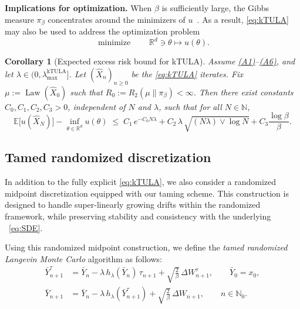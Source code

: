 \documentclass[11pt,a4paper,reqno]{amsart}
\theoremstyle{plain}
\newtheorem{corollary}{Corollary}
\theoremstyle{definition}
\theoremstyle{remark}
\newcommand{\R}{\mathbb{R}}
\newcommand{\E}{\mathbb{E}}
\DeclareMathOperator{\Law}{Law}
\begin{document}
\medskip
\noindent\textbf{Implications for optimization.}
When $\beta$ is sufficiently large, the Gibbs measure $\pi_\beta$ concentrates around the minimizers of $u$~\cite{hwang1980laplace}. As a result, \eqref{eq:kTULA} may also be used to address the optimization problem
\[
\operatorname*{minimize} \qquad \mathbb{R}^d \ni \theta \mapsto u(\theta).
\]

\begin{corollary}[Expected excess risk bound for kTULA]
\label{cor:excess-risk-ktula}
Assume \hyperref[ass:PJG]{\textup{(A1)}}--\hyperref[ass:LSI]{\textup{(A6)}}, and let $\lambda\in(0,\lambda_{\max}^{\mathrm{kTULA}}]$. Let $(\widehat X_n)_{n\ge0}$ be the \eqref{eq:kTULA} iterates. Fix $\mu:=\Law(\widehat X_0)$ such that $R_0:=R_2(\mu\|\pi_\beta)<\infty$.
Then there exist constants $C_0,C_1,C_2,C_3>0$, independent of $N$ and $\lambda$, such that for all $N\in\mathbb N$,
\begin{equation}\label{eq:excess-risk-ktula-statement}
\E\!\bigl[u(\widehat X_N)\bigr]-\inf_{\theta\in\R^d}u(\theta)
\;\le\;
C_1\,e^{-C_0N\lambda}
+
C_2\,\lambda\,\sqrt{(N\lambda)\vee\log N}
+
C_3\frac{\log \beta}{\beta}.
\end{equation}
\end{corollary}



\subsection{Tamed randomized discretization}
\label{subsec:tRLMC}

In addition to the fully explicit \eqref{eq:kTULA},
we also consider a randomized midpoint discretization equipped with our taming scheme.
This construction is designed to handle super-linearly growing drifts within
the randomized framework, while preserving stability and consistency
with the underlying ~\eqref{eq:SDE}.

Using this randomized midpoint construction, we define the
\emph{tamed randomized Langevin Monte Carlo} algorithm
as follows:
\begin{equation}
\label{eq:tamed-rLMC}
\tag{tRLMC}
\begin{aligned}
\bar Y_{n+1}^{\tau}
&=
\bar Y_n
-
\lambda\, h_\lambda(\bar Y_n)\,\tau_{n+1}
+
\sqrt{\tfrac{2}{\beta}}\,\Delta W_{n+1}^{\tau},
\qquad
\bar Y_0 = x_0,\\
\bar Y_{n+1}
&=
\bar Y_n
-
\lambda\, h_\lambda(\bar Y_{n+1}^{\tau})
+
\sqrt{\tfrac{2}{\beta}}\,\Delta W_{n+1},
\qquad n\in\mathbb{N}_0.
\end{aligned}
\end{equation}
\end{document}
